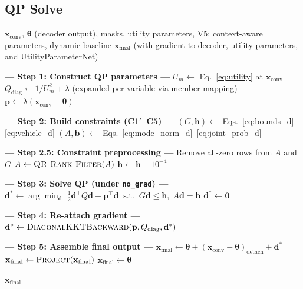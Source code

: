 \documentclass[11pt,a4paper]{article}
\newcommand{\xconv}{\mathbf{x}_{\mathrm{conv}}}
\newcommand{\xfinal}{\mathbf{x}_{\mathrm{final}}}
\newcommand{\thetapacked}{\boldsymbol{\theta}}
\begin{document}
\subsection{QP Solve}

\begin{algorithm}[ht]
\caption{Phase~2: QP Solve with Gradient Re-attachment}
\label{alg:optnet}
\begin{algorithmic}[1]
\Require $\xconv$, $\thetapacked$ (decoder output), masks, utility parameters, V5: context-aware parameters, dynamic baseline
\Ensure $\xfinal$ (with gradient to decoder, utility parameters, and UtilityParameterNet)

\Statex \textbf{--- Step 1: Construct QP parameters ---}
\State $U_m \gets$ Eq.~\eqref{eq:utility} at $\xconv$ 
\State $Q_{\mathrm{diag}} \gets 1/U_m^2 + \lambda$ \quad (expanded per variable via member mapping) 
\State $\mathbf{p} \gets \lambda(\xconv - \thetapacked)$ 

\Statex \textbf{--- Step 2: Build constraints (C1$'$--C5) ---}
\State $(G, \mathbf{h}) \gets$ Eqs.~\eqref{eq:bounds_d}--\eqref{eq:vehicle_d} 
\State $(A, \mathbf{b}) \gets$ Eqs.~\eqref{eq:mode_norm_d}--\eqref{eq:joint_prob_d} 

\Statex \textbf{--- Step 2.5: Constraint preprocessing ---}
\State Remove all-zero rows from $A$ and $G$ 
\State $A \gets \textsc{QR-Rank-Filter}(A)$ 
\State $\mathbf{h} \gets \mathbf{h} + 10^{-4}$ 

\Statex \textbf{--- Step 3: Solve QP (under \texttt{no\_grad}) ---}
\State $\mathbf{d}^* \gets \arg\min_{\mathbf{d}} \; \tfrac{1}{2} \mathbf{d}^\top Q \mathbf{d} + \mathbf{p}^\top \mathbf{d} \;\;\text{s.t.}\;\; G\mathbf{d} \leq \mathbf{h},\; A\mathbf{d} = \mathbf{b}$
 $\mathbf{d}^* \gets \mathbf{0}$ \EndIf

\Statex \textbf{--- Step 4: Re-attach gradient ---}
\State $\mathbf{d}^* \gets \textsc{DiagonalKKTBackward}(\mathbf{p}, Q_{\mathrm{diag}}, \mathbf{d}^*)$ 

\Statex \textbf{--- Step 5: Assemble final output ---}
\State $\xfinal \gets \thetapacked + (\xconv - \thetapacked)_{\mathrm{detach}} + \mathbf{d}^*$ 
\State $\xfinal \gets \textsc{Project}(\xfinal)$
\If{$\xfinal$ contains NaN} $\xfinal \gets \thetapacked$  \EndIf

\State \Return $\xfinal$
\end{algorithmic}
\end{algorithm}
\end{document}
